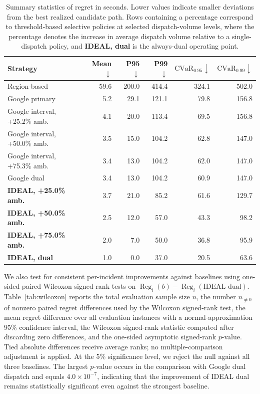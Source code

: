 \documentclass[11pt, letterpaper, oneside, reqno]{amsart}
\begin{document}
\begin{table}[h]
    \centering
    \small
    \setlength{\tabcolsep}{3pt}
    \caption{Summary statistics of regret in seconds. Lower values indicate smaller deviations from the best realized candidate path. Rows containing a percentage correspond to threshold-based selective policies at selected dispatch-volume levels, where the percentage denotes the increase in average dispatch volume relative to a single-dispatch policy, and \textbf{IDEAL, dual} is the always-dual operating point.}
    \label{tab:regret-metrics}
    \begin{tabular}{lrrrrr}
    \toprule
    Strategy & Mean $\downarrow$ & P95 $\downarrow$ & P99 $\downarrow$ & $\mathrm{CVaR}_{0.95}\downarrow$ & $\mathrm{CVaR}_{0.99}\downarrow$ \\
    \midrule
Region-based & 59.6 & 200.0 & 414.4 & 324.1 & 502.0 \\
Google primary & 5.2 & 29.1 & 121.1 & 79.8 & 156.8 \\
Google interval, +25.2\% amb. & 4.1 & 20.0 & 113.4 & 69.5 & 156.8 \\
Google interval, +50.0\% amb. & 3.5 & 15.0 & 104.2 & 62.8 & 147.0 \\
Google interval, +75.3\% amb. & 3.4 & 13.0 & 104.2 & 62.0 & 147.0 \\
Google dual & 3.4 & 13.0 & 104.2 & 60.9 & 147.0 \\
\textbf{IDEAL, +25.0\% amb.} & 3.7 & 21.0 & 85.2 & 61.6 & 129.7 \\
\textbf{IDEAL, +50.0\% amb.} & 2.5 & 12.0 & 57.0 & 43.3 & 98.2 \\
\textbf{IDEAL, +75.0\% amb.} & 2.0 & 7.0 & 50.0 & 36.8 & 95.9 \\
\textbf{IDEAL, dual} & 1.0 & 0.0 & 37.0 & 20.5 & 63.6 \\
\bottomrule
\end{tabular}
\end{table}

We also test for consistent per-incident improvements against baselines using one-sided paired Wilcoxon signed-rank tests on $\operatorname{Reg}_i(b)-\operatorname{Reg}_i(\text{IDEAL dual})$. Table~\ref{tab:wilcoxon} reports the total evaluation sample size $n$, the number $n_{\ne0}$ of nonzero paired regret differences used by the Wilcoxon signed-rank test, the mean regret difference over all evaluation instances with a normal-approximation 95\% confidence interval, the Wilcoxon signed-rank statistic computed after discarding zero differences, and the one-sided asymptotic signed-rank $p$-value. Tied absolute differences receive average ranks; no multiple-comparison adjustment is applied. At the 5\% significance level, we reject the null against all three baselines. The largest $p$-value occurs in the comparison with Google dual dispatch and equals $4.0\times 10^{-7}$, indicating that the improvement of IDEAL dual remains statistically significant even against the strongest baseline.
\end{document}
